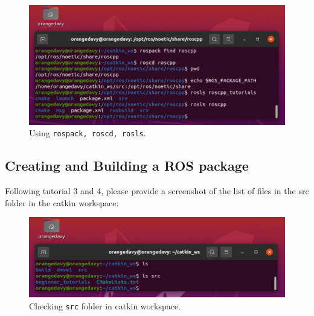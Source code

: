 \documentclass[12pt]{article}
\begin{document}
\begin{figure}[H]
  \centering\includegraphics[width=14cm]{images/rospack_roscd_rosls.png}\vspace{-10pt}
  \caption{Using \texttt{rospack, roscd, rosls}.}\label{fig:rospack_roscd_rosls}
  \end{figure}


\subsection{Creating and Building a ROS package}
Following tutorial 3 and 4, please provide a screenshot of the list of files in the src folder in the catkin workspace:

\begin{figure}[H]
  \centering\includegraphics[width=14cm]{images/catkin_ws_src.png}\vspace{-10pt}
  \caption{Checking \texttt{src} folder in catkin workspace.}\label{fig:catkin_ws_src}
  \end{figure}
\end{document}
